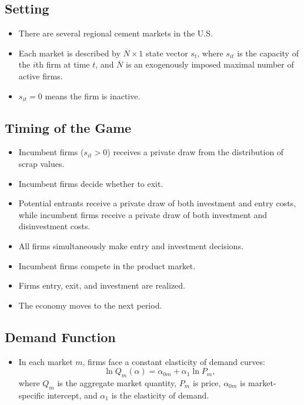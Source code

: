 \documentclass[
]{book}
\providecommand{\tightlist}{%
  \setlength{\itemsep}{0pt}\setlength{\parskip}{0pt}}
\begin{document}
\hypertarget{setting-3}{%
\subsection{Setting}\label{setting-3}}

\begin{itemize}
\tightlist
\item
  There are several regional cement markets in the U.S.
\item
  Each market is described by \(\overline{N} \times 1\) state vector \(s_t\), where \(s_{it}\) is the capacity of the \(i\)th firm at time \(t\), and \(\overline{N}\) is an exogenously imposed maximal number of active firms.
\item
  \(s_{it} = 0\) means the firm is inactive.
\end{itemize}

\hypertarget{timing-of-the-game}{%
\subsection{Timing of the Game}\label{timing-of-the-game}}

\begin{itemize}
\tightlist
\item
  Incumbent firms (\(s_{it} > 0\)) receives a private draw from the distribution of scrap values.
\item
  Incumbent firms decide whether to exit.
\item
  Potential entrants receive a private draw of both investment and entry costs, while incumbent firms receive a private draw of both investment and disinvestment costs.
\item
  All firms simultaneously make entry and investment decisions.
\item
  Incumbent firms compete in the product market.
\item
  Firms entry, exit, and investment are realized.
\item
  The economy moves to the next period.
\end{itemize}

\hypertarget{demand-function}{%
\subsection{Demand Function}\label{demand-function}}

\begin{itemize}
\tightlist
\item
  In each market \(m\), firms face a constant elasticity of demand curves:
  \begin{equation}
  \ln Q_m(\alpha) = \alpha_{0m} + \alpha_1 \ln P_m,
  \end{equation}
  where \(Q_m\) is the aggregate market quantity, \(P_m\) is price, \(\alpha_{0m}\) is market-specific intercept, and \(\alpha_1\) is the elasticity of demand.
\end{itemize}
\end{document}
